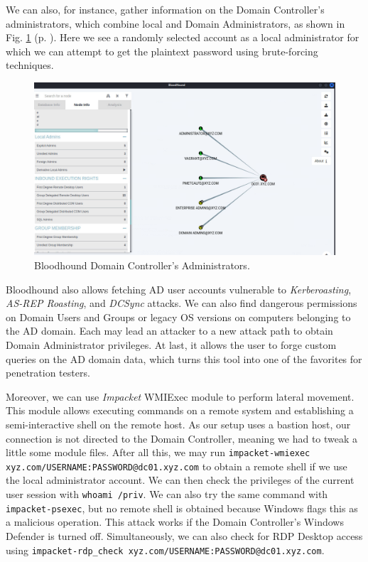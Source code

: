 We can also, for instance, gather information on the Domain Controller's administrators, which combine local and Domain Administrators, as shown in Fig. \ref{fig:bloodhound_dc_admins} (p. \pageref{fig:bloodhound_dc_admins}). Here we see a randomly selected account as a local administrator for which we can attempt to get the plaintext password using brute-forcing techniques.

\begin{figure}[H]
    \includegraphics[width=12cm]{figures/bloodhound_dc_admins.png}
    \caption{Bloodhound Domain Controller's Administrators.}
    \label{fig:bloodhound_dc_admins}
\end{figure}

Bloodhound also allows fetching AD user accounts vulnerable to \textit{Kerberoasting}, \textit{AS-REP Roasting}, and \textit{DCSync} attacks. We can also find dangerous permissions on Domain Users and Groups or legacy OS versions on computers belonging to the AD domain. Each may lead an attacker to a new attack path to obtain Domain Administrator privileges. At last, it allows the user to forge custom queries on the AD domain data, which turns this tool into one of the favorites for penetration testers. 

Moreover, we can use \textit{Impacket} WMIExec module to perform lateral movement. This module allows executing commands on a remote system and establishing a semi-interactive shell on the remote host. As our setup uses a bastion host, our connection is not directed to the Domain Controller, meaning we had to tweak a little some module files. After all this, we may run \texttt{impacket-wmiexec xyz.com/USERNAME:PASSWORD@dc01.xyz.com} to obtain a remote shell if we use the local administrator account. We can then check the privileges of the current user session with \texttt{whoami /priv}. We can also try the same command with \texttt{impacket-psexec}, but no remote shell is obtained because Windows flags this as a malicious operation. This attack works if the Domain Controller's Windows Defender is turned off. Simultaneously, we can also check for RDP Desktop access using \texttt{impacket-rdp\_check xyz.com/USERNAME:PASSWORD@dc01.xyz.com}.

